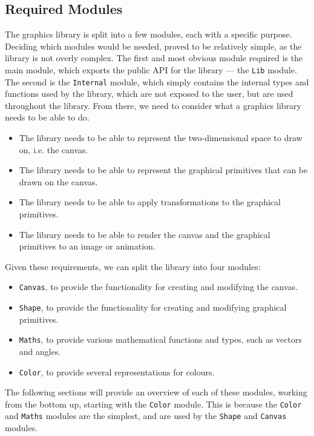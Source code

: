 \documentclass[../main.tex]{subfiles}
\begin{document}
        \subsection{Required Modules}
            The graphics library is split into a few modules, each with a specific purpose.
            Deciding which modules would be needed, proved to be relatively simple, as the
                library is not overly complex.
            The first and most obvious module required is the main module, which exports
                the public API for the library — the \verb|Lib| module.
            The second is the \verb|Internal| module, which simply contains the internal
                types and functions used by the library, which are not exposed to the user, but
                are used throughout the library.
            From there, we need to consider what a graphics library needs to be able to do.
            \begin{itemize}
                \item The library needs to be able to represent the two-dimensional space
                      to draw on, i.e. the canvas.
                \item The library needs to be able to represent the graphical primitives
                      that can be drawn on the canvas.
                \item The library needs to be able to apply transformations to the graphical
                      primitives.
                \item The library needs to be able to render the canvas and the graphical
                      primitives to an image or animation.
            \end{itemize}
            Given these requirements, we can split the library into four modules:
            \begin{itemize}
                \item \verb|Canvas|, to provide the functionality for creating and modifying
                      the canvas.
                \item \verb|Shape|, to provide the functionality for creating and modifying
                      graphical primitives.
                \item \verb|Maths|, to provide various mathematical functions and types, such
                      as vectors and angles.
                \item \verb|Color|, to provide several representations for colours.
            \end{itemize}
            The following sections will provide an overview of each of these modules,
                working from the bottom up, starting with the \verb|Color| module.
            This is because the \verb|Color| and \verb|Maths| modules are the simplest, and
                are used by the \verb|Shape| and \verb|Canvas| modules.
\end{document}
